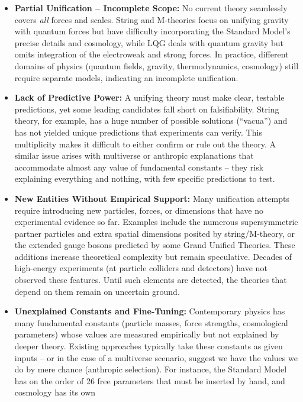 \documentclass[
]{article}
\begin{document}
\begin{itemize}
\item
  \textbf{Partial Unification -- Incomplete Scope:} No current theory
  seamlessly covers \emph{all} forces and scales. String and M-theories
  focus on unifying gravity with quantum forces but have difficulty
  incorporating the Standard Model's precise details and cosmology,
  while LQG deals with quantum gravity but omits integration of the
  electroweak and strong forces. In practice, different domains of
  physics (quantum fields, gravity, thermodynamics, cosmology) still
  require separate models, indicating an incomplete unification.
\item
  \textbf{Lack of Predictive Power:} A unifying theory must make clear,
  testable predictions, yet some leading candidates fall short on
  falsifiability. String theory, for example, has a huge number of
  possible solutions (``vacua'') and has not yielded unique predictions
  that experiments can verify. This multiplicity makes it difficult to
  either confirm or rule out the theory. A similar issue arises with
  multiverse or anthropic explanations that accommodate almost any value
  of fundamental constants -- they risk explaining everything and
  nothing, with few specific predictions to test.
\item
  \textbf{New Entities Without Empirical Support:} Many unification
  attempts require introducing new particles, forces, or dimensions that
  have no experimental evidence so far. Examples include the numerous
  supersymmetric partner particles and extra spatial dimensions posited
  by string/M-theory, or the extended gauge bosons predicted by some
  Grand Unified Theories. These additions increase theoretical
  complexity but remain speculative. Decades of high-energy experiments
  (at particle colliders and detectors) have not observed these
  features. Until such elements are detected, the theories that depend
  on them remain on uncertain ground.
\item
  \textbf{Unexplained Constants and Fine-Tuning:} Contemporary physics
  has many fundamental constants (particle masses, force strengths,
  cosmological parameters) whose values are measured empirically but not
  explained by deeper theory. Existing approaches typically take these
  constants as given inputs -- or in the case of a multiverse scenario,
  suggest we have the values we do by mere chance (anthropic selection).
  For instance, the Standard Model has on the order of 26 free
  parameters that must be inserted by hand, and cosmology has its own

\end{itemize}
\end{document}

